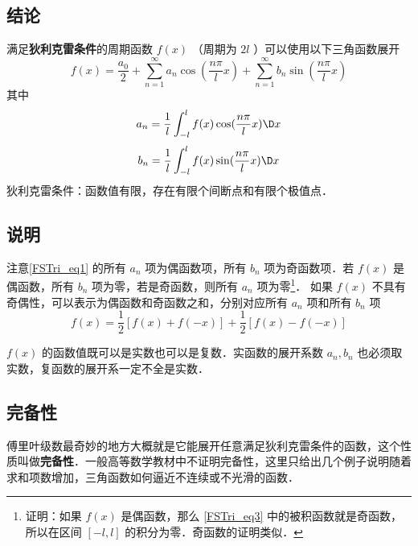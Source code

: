 



\subsection{结论}
满足\textbf{狄利克雷条件}的周期函数 $f(x)$ （周期为 $2l$ ）可以使用以下三角函数展开
\begin{equation}\label{FSTri_eq1}
f( x ) = \frac{a_0}{2} + \sum_{n = 1}^\infty a_n \cos (\frac{n\pi}{l}x) + \sum_{n = 1}^\infty b_n \sin (\frac{n\pi}{l}x)
\end{equation}
其中
\begin{equation}\label{FSTri_eq2}
{a_n} = \frac{1}{l}\int_{ - l}^l {f( x )\cos (\frac{n\pi}{l}x)\D x} 
\end{equation}
\begin{equation}\label{FSTri_eq3}
{b_n} = \frac{1}{l}\int_{ - l}^l {f( x )\sin (\frac{n\pi}{l}x)\D x}
\end{equation}
狄利克雷条件：函数值有限，存在有限个间断点和有限个极值点．

\subsection{说明}
注意\autoref{FSTri_eq1} 的所有 $a_n$ 项为偶函数项，所有 $b_n$ 项为奇函数项．若 $f(x)$ 是偶函数，所有 $b_n$ 项为零，若是奇函数，则所有 $a_n$ 项为零\footnote{证明：如果 $f(x)$ 是偶函数，那么 \autoref{FSTri_eq3} 中的被积函数就是奇函数，所以在区间 $[-l,l]$ 的积分为零．奇函数的证明类似．}． 如果 $f(x)$ 不具有奇偶性，可以表示为偶函数和奇函数之和，分别对应所有 $a_n$ 项和所有 $b_n$ 项
\begin{equation}
f(x) = \frac 12 [f(x)+f(-x)] + \frac 12 [f(x)-f(-x)]
\end{equation}

$f(x)$ 的函数值既可以是实数也可以是复数．实函数的展开系数 $a_n, b_n$ 也必须取实数，复函数的展开系一定不全是实数．

\subsection{完备性}
傅里叶级数最奇妙的地方大概就是它能展开任意满足狄利克雷条件的函数，这个性质叫做\textbf{完备性}．一般高等数学教材中不证明完备性，这里只给出几个例子说明随着求和项数增加，三角函数如何逼近不连续或不光滑的函数．

